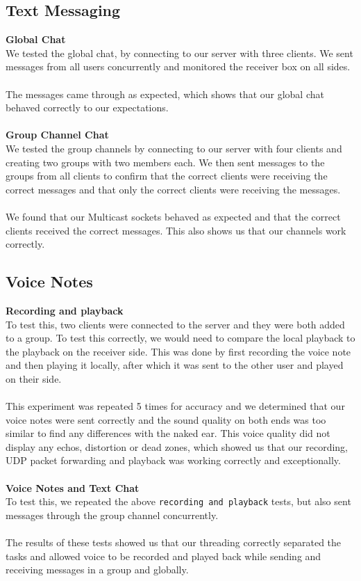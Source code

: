 \documentclass[13pt]{article}
\begin{document}
\subsection{Text Messaging}

\textbf{Global Chat} \\
We tested the global chat, by connecting to our server with three clients. We sent messages from all users concurrently and monitored the receiver box on all sides.
\\\\
The messages came through as expected, which shows that our global chat behaved correctly to our expectations.
\\\\
\textbf{Group Channel Chat} \\
We tested the group channels by connecting to our server with four clients and creating two groups with two members each. We then sent messages to the groups from all clients to confirm that the correct clients were receiving the correct messages and that only the correct clients were receiving the messages.
\\\\
We found that our Multicast sockets behaved as expected and that the correct clients received the correct  messages. This also shows us that our channels work correctly.

\subsection{Voice Notes}

\textbf{Recording and playback} \\
To test this, two clients were connected to the server and they were both added to a group. To test this correctly, we would need to compare the local playback to the playback on the receiver side. This was done by first recording the voice note and then playing it locally, after which it was sent to the other user and played on their side.
\\\\
This experiment was repeated 5 times for accuracy and we determined that our voice notes were sent correctly and the sound quality on both ends was too similar to find any differences with the naked ear. This voice quality did not display any echos, distortion or dead zones, which showed us that our recording, UDP packet forwarding and playback was working correctly and exceptionally.
\\\\
\textbf{Voice Notes and Text Chat}\\
To test this, we repeated the above \texttt{recording and playback} tests, but also sent messages through the group channel concurrently.
\\\\
The results of these tests showed us that our threading correctly separated the tasks and allowed voice to be recorded and played back while sending and receiving messages in a group and globally.
\end{document}
